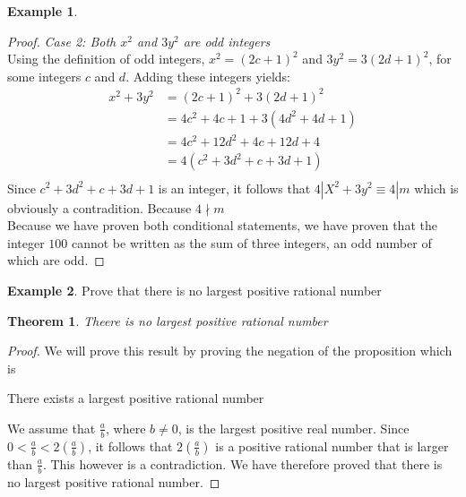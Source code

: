 \documentclass{book}
\newtheorem{theorem}{Theorem}[section]
\theoremstyle{definition}
\newtheorem{example}{Example}[definition]
\theoremstyle{remark}
\begin{document}
\begin{example}
\begin{proof}
    \textit{Case 2: Both $x^2$ and $3y^2$ are odd integers} \\
        Using the definition of odd integers, $x^2 = (2c + 1)^2$ and $3y^2 = 3(2d + 1)^2$, for some integers $c$ and $d$. Adding these integers yields: 
            \begin{align*}
                 x^2 + 3y^2 & = (2c + 1)^2 + 3(2d + 1)^2 \\
                    & = 4c^2 + 4c + 1 + 3(4d^2 + 4d + 1) \\
                    & = 4c^2 + 12d^2 + 4c + 12d + 4  \\
                    & = 4(c^2 + 3d^2 + c + 3d + 1)  \\
            \end{align*}
        Since $c^2 + 3d^2 + c + 3d + 1$ is an integer,  it follows that $4 | X^2 + 3y^2 \equiv 4 | m$ which is obviously a contradition. Because $4 \nmid m$ \\
        
    Because we have proven both conditional statements, we have proven that the integer $100$ cannot be written as the sum of three integers, an odd number of which are odd. 
\end{proof}
\end{example}


\newpage
\begin{example}
Prove that there is no largest positive rational number
\begin{tcolorbox}
    \begin{theorem}
        Theere is no largest positive rational number
    \end{theorem} 
\end{tcolorbox}


\begin{proof}

We will prove this result by proving the negation of the proposition which is
	\begin{center}
		There exists a largest positive rational number
	\end{center}

We assume that $\frac{a}{b}$, where $b \neq 0$, is the largest positive real number. Since $0 < \frac{a}{b} < 2(\frac{a}{b})$, it follows that $2(\frac{a}{b})$ is a positive rational number that is larger than $\frac{a}{b}$. This however is a contradiction. We have therefore proved that there is no largest positive rational number.
\end{proof}
\end{example}
\end{document}
